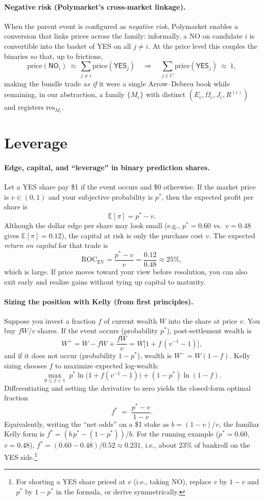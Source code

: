 \paragraph{Negative risk (Polymarket’s cross-market linkage).}
When the parent event is configured as \emph{negative risk}, Polymarket enables a conversion that links prices across the family:
informally, a \textsf{NO} on candidate $i$ is convertible into the basket of \textsf{YES} on all $j\neq i$.
At the price level this couples the binaries so that, up to frictions,
\[
\mathrm{price}(\textsf{NO}_i)\ \approx\ \sum_{j\neq i}\mathrm{price}(\textsf{YES}_j)
\quad\Longrightarrow\quad
\sum_{j\in C}\mathrm{price}(\textsf{YES}_j)\ \approx\ 1,
\]
making the bundle trade \emph{as if} it were a single Arrow--Debreu book while remaining, in our abstraction, a family $\{M_c\}$ with distinct $(E_c,\Omega_c,J_c,R^{(c)})$ and registers $\mathrm{res}_{M_c}$.


\section{Leverage}

\paragraph{Edge, capital, and “leverage” in binary prediction shares.}
Let a YES share pay \$1 if the event occurs and \$0 otherwise. If the market price is $v\in(0,1)$ and your subjective probability is $p^*$, then the expected profit per share is
\[
\mathbb{E}[\pi]=p^*-v.
\]
Although the dollar edge per share may look small (e.g., $p^*=0.60$ vs.\ $v=0.48$ gives $\mathbb{E}[\pi]=0.12$), the capital at risk is only the purchase cost $v$. The expected \emph{return on capital} for that trade is
\[
\mathrm{ROC}_{\text{EV}}=\frac{p^*-v}{v}=\frac{0.12}{0.48}\approx 25\%,
\]
which is large. If price moves toward your view before resolution, you can also exit early and realize gains without tying up capital to maturity.

\paragraph{Sizing the position with Kelly (from first principles).}
Suppose you invest a fraction $f$ of current wealth $W$ into the share at price $v$. You buy $fW/v$ shares. If the event occurs (probability $p^*$), post-settlement wealth is
\[
W^+=W - fW + \frac{fW}{v}=W\bigl[1 + f\,(v^{-1}-1)\bigr],
\]
and if it does not occur (probability $1-p^*$), wealth is $W^-=W(1-f)$. Kelly sizing chooses $f$ to maximize expected log-wealth:
\[
\max_{0\le f<1}\; p^* \ln\!\bigl(1+ f(v^{-1}-1)\bigr) + (1-p^*)\ln(1-f).
\]
Differentiating and setting the derivative to zero yields the closed-form optimal fraction
\[
f^* \;=\; \frac{p^*-v}{1-v}.
\]
Equivalently, writing the “net odds” on a \$1 stake as $b=(1-v)/v$, the familiar Kelly form is $f^*=(b\,p^*-(1-p^*))/b$. For the running example ($p^*=0.60$, $v=0.48$), $f^*\!=\!(0.60-0.48)/0.52\approx 0.231$, i.e., about $23\%$ of bankroll on the YES side.\footnote{For shorting a YES share priced at $v$ (i.e., taking NO), replace $v$ by $1-v$ and $p^*$ by $1-p^*$ in the formula, or derive symmetrically.}

